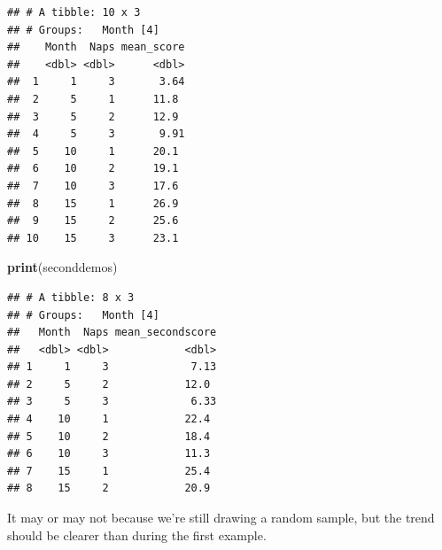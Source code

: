 \documentclass[]{book}
\newenvironment{Shaded}{\begin{snugshade}}{\end{snugshade}}
\newcommand{\CommentTok}[1]{\textcolor[rgb]{0.56,0.35,0.01}{\textit{#1}}}
\newcommand{\DataTypeTok}[1]{\textcolor[rgb]{0.13,0.29,0.53}{#1}}
\newcommand{\KeywordTok}[1]{\textcolor[rgb]{0.13,0.29,0.53}{\textbf{#1}}}
\newcommand{\NormalTok}[1]{#1}
\newcommand{\OperatorTok}[1]{\textcolor[rgb]{0.81,0.36,0.00}{\textbf{#1}}}
\newcommand{\OtherTok}[1]{\textcolor[rgb]{0.56,0.35,0.01}{#1}}
\newcommand{\StringTok}[1]{\textcolor[rgb]{0.31,0.60,0.02}{#1}}
\begin{document}
\begin{Shaded}
\end{Shaded}

\begin{verbatim}
## # A tibble: 10 x 3
## # Groups:   Month [4]
##    Month  Naps mean_score
##    <dbl> <dbl>      <dbl>
##  1     1     3       3.64
##  2     5     1      11.8 
##  3     5     2      12.9 
##  4     5     3       9.91
##  5    10     1      20.1 
##  6    10     2      19.1 
##  7    10     3      17.6 
##  8    15     1      26.9 
##  9    15     2      25.6 
## 10    15     3      23.1
\end{verbatim}

\begin{Shaded}
\begin{Highlighting}[]
\KeywordTok{print}\NormalTok{(seconddemos)}
\end{Highlighting}
\end{Shaded}

\begin{verbatim}
## # A tibble: 8 x 3
## # Groups:   Month [4]
##   Month  Naps mean_secondscore
##   <dbl> <dbl>            <dbl>
## 1     1     3             7.13
## 2     5     2            12.0 
## 3     5     3             6.33
## 4    10     1            22.4 
## 5    10     2            18.4 
## 6    10     3            11.3 
## 7    15     1            25.4 
## 8    15     2            20.9
\end{verbatim}

It may or may not because we're still drawing a random sample, but the trend should be clearer than during the first example.
\end{document}
